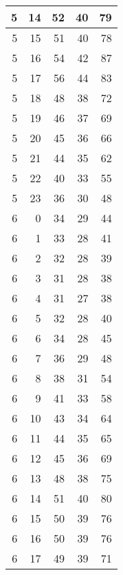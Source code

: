 \begin{longtable}{|r|r|r|r|r|}
    \hline
    5     & 14    & 52    & 40    & 79 \\
    \hline
    5     & 15    & 51    & 40    & 78 \\
    \hline
    5     & 16    & 54    & 42    & 87 \\
    \hline
    5     & 17    & 56    & 44    & 83 \\
    \hline
    5     & 18    & 48    & 38    & 72 \\
    \hline
    5     & 19    & 46    & 37    & 69 \\
    \hline
    5     & 20    & 45    & 36    & 66 \\
    \hline
    5     & 21    & 44    & 35    & 62 \\
    \hline
    5     & 22    & 40    & 33    & 55 \\
    \hline
    5     & 23    & 36    & 30    & 48 \\
    \hline
    6     & 0     & 34    & 29    & 44 \\
    \hline
    6     & 1     & 33    & 28    & 41 \\
    \hline
    6     & 2     & 32    & 28    & 39 \\
    \hline
    6     & 3     & 31    & 28    & 38 \\
    \hline
    6     & 4     & 31    & 27    & 38 \\
    \hline
    6     & 5     & 32    & 28    & 40 \\
    \hline
    6     & 6     & 34    & 28    & 45 \\
    \hline
    6     & 7     & 36    & 29    & 48 \\
    \hline
    6     & 8     & 38    & 31    & 54 \\
    \hline
    6     & 9     & 41    & 33    & 58 \\
    \hline
    6     & 10    & 43    & 34    & 64 \\
    \hline
    6     & 11    & 44    & 35    & 65 \\
    \hline
    6     & 12    & 45    & 36    & 69 \\
    \hline
    6     & 13    & 48    & 38    & 75 \\
    \hline
    6     & 14    & 51    & 40    & 80 \\
    \hline
    6     & 15    & 50    & 39    & 76 \\
    \hline
    6     & 16    & 50    & 39    & 76 \\
    \hline
    6     & 17    & 49    & 39    & 71 \\

\end{longtable}
